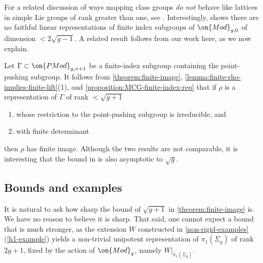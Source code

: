 \begin{remark}
\notready\label{remark:FLM-rank-1-result}
	For a related discussion of ways mapping class groups \emph{do not} behave like lattices in simple Lie groups of rank greater than one, see \cite{farbLM:rank-1-phenomena}. Interestingly, \cite[Theorem 1.6]{farbLM:rank-1-phenomena} shows there are no faithful linear
representations of finite index subgroups of $\on{Mod}_{g,0}$ of dimension $< 2 \sqrt{g-1}$. A related result follows from our work here, as we now explain.

Let $\Gamma\subset \on{PMod}_{g,n+1}$ be a finite-index subgroup containing the point-pushing subgroup.
It follows from \autoref{theorem:finite-image},
\autoref{lemma:finite-rho-implies-finite-lift}(1), and
\autoref{proposition:MCG-finite-index-rep}
that if $\rho$ is a representation of $\Gamma$ of rank $<\sqrt{g+1}$
\begin{enumerate}
\item 	whose restriction to the point-pushing subgroup is irreducible, and
\item with finite determinant
\end{enumerate}
then $\rho$ has finite image.
Although the two results are not comparable,
it is interesting that the bound in
\cite{farbLM:rank-1-phenomena} is also asymptotic to $\sqrt{g}$.
\end{remark}

\subsection{Bounds and examples}\label{question:bounds}
It is natural to ask how sharp the bound of $\sqrt{g+1}$ in
\autoref{theorem:finite-image} is. We have no reason to believe it is sharp.
That said, one cannot expect a bound that is much stronger, as the extension
$W$ constructed in \autoref{non-rigid-examples}(\ref{h1-example}) yields a
non-trivial unipotent representation of $\pi_1(\Sigma_g)$ of rank $2g+1$, fixed
by the action of $\on{Mod}_g$, namely $W|_{\pi_1(\Sigma_g)}$.


